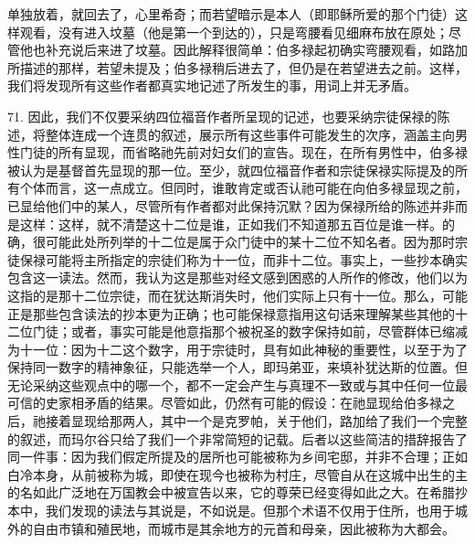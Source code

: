 单独放着，就回去了，心里希奇；而若望暗示是本人（即耶稣所爱的那个门徒）这样观看，没有进入坟墓（他是第一个到达的），只是弯腰看见细麻布放在原处；尽管他也补充说后来进了坟墓。因此解释很简单：伯多禄起初确实弯腰观看，如路加所描述的那样，若望未提及；伯多禄稍后进去了，但仍是在若望进去之前。这样，我们将发现所有这些作者都真实地记述了所发生的事，用词上并无矛盾。\par

71. 因此，我们不仅要采纳四位福音作者所呈现的记述，也要采纳宗徒保禄的陈述，将整体连成一个连贯的叙述，展示所有这些事件可能发生的次序，涵盖主向男性门徒的所有显现，而省略祂先前对妇女们的宣告。现在，在所有男性中，伯多禄被认为是基督首先显现的那一位。至少，就四位福音作者和宗徒保禄实际提及的所有个体而言，这一点成立。但同时，谁敢肯定或否认祂可能在向伯多禄显现之前，已显给他们中的某人，尽管所有作者都对此保持沉默？因为保禄所给的陈述并非而是这样：这样，就不清楚这十二位是谁，正如我们不知道那五百位是谁一样。的确，很可能此处所列举的十二位是属于众门徒中的某十二位不知名者。因为那时宗徒保禄可能将主所指定的宗徒们称为十一位，而非十二位。事实上，一些抄本确实包含这一读法。然而，我认为这是那些对经文感到困惑的人所作的修改，他们以为这指的是那十二位宗徒，而在犹达斯消失时，他们实际上只有十一位。那么，可能正是那些包含读法的抄本更为正确；也可能保禄意指用这句话来理解某些其他的十二位门徒；或者，事实可能是他意指那个被祝圣的数字保持如前，尽管群体已缩减为十一位：因为十二这个数字，用于宗徒时，具有如此神秘的重要性，以至于为了保持同一数字的精神象征，只能选举一个人，即玛弟亚，来填补犹达斯的位置。但无论采纳这些观点中的哪一个，都不一定会产生与真理不一致或与其中任何一位最可信的史家相矛盾的结果。尽管如此，仍然有可能的假设：在祂显现给伯多禄之后，祂接着显现给那两人，其中一个是克罗帕，关于他们，路加给了我们一个完整的叙述，而玛尔谷只给了我们一个非常简短的记载。后者以这些简洁的措辞报告了同一件事：因为我们假定所提及的居所也可能被称为乡间宅邸，并非不合理；正如白冷本身，从前被称为城，即使在现今也被称为村庄，尽管自从在这城中出生的主的名如此广泛地在万国教会中被宣告以来，它的尊荣已经变得如此之大。在希腊抄本中，我们发现的读法与其说是，不如说是。但那个术语不仅用于住所，也用于城外的自由市镇和殖民地，而城市是其余地方的元首和母亲，因此被称为大都会。\par

